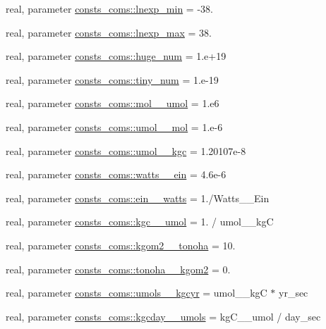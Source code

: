 \begin{DoxyCompactItemize}
\item 
real, parameter \hyperlink{namespaceconsts__coms_a7593d016f6b5a649ea21585de53834f0}{consts\+\_\+coms\+::lnexp\+\_\+min} = -\/38.
\item 
real, parameter \hyperlink{namespaceconsts__coms_aeb257212c54fabf595d8fb81170ef1d8}{consts\+\_\+coms\+::lnexp\+\_\+max} = 38.
\item 
real, parameter \hyperlink{namespaceconsts__coms_a6a5c10fb375429bb6cbc12bb37617f31}{consts\+\_\+coms\+::huge\+\_\+num} = 1.e+19
\item 
real, parameter \hyperlink{namespaceconsts__coms_a9dc9f1b4f076c19c09ba1adb961cddc3}{consts\+\_\+coms\+::tiny\+\_\+num} = 1.e-\/19
\item 
real, parameter \hyperlink{namespaceconsts__coms_a68d9924e4ce2e95d25b3c4862bf895d8}{consts\+\_\+coms\+::mol\+\_\+\_\+umol} = 1.e6
\item 
real, parameter \hyperlink{namespaceconsts__coms_aba28d1403d413d9d638ca1bf165cdd7a}{consts\+\_\+coms\+::umol\+\_\+\_\+mol} = 1.e-\/6
\item 
real, parameter \hyperlink{namespaceconsts__coms_a756eff7bd58f33114bdbf059ce2c6726}{consts\+\_\+coms\+::umol\+\_\+\_\+kgc} = 1.\+20107e-\/8
\item 
real, parameter \hyperlink{namespaceconsts__coms_aa14064c869d9c4d8d2b81b03e660b7d0}{consts\+\_\+coms\+::watts\+\_\+\_\+ein} = 4.\+6e-\/6
\item 
real, parameter \hyperlink{namespaceconsts__coms_a6eb4fb188bbbc09a5b24e1ffa57e03aa}{consts\+\_\+coms\+::ein\+\_\+\_\+watts} = 1./Watts\+\_\+\_\+\+Ein
\item 
real, parameter \hyperlink{namespaceconsts__coms_ac17190e203b566b6be141ddcd8344ae9}{consts\+\_\+coms\+::kgc\+\_\+\_\+umol} = 1. / umol\+\_\+\_\+kgC
\item 
real, parameter \hyperlink{namespaceconsts__coms_a2061fb811f5d7c9f856e62b48d85c10c}{consts\+\_\+coms\+::kgom2\+\_\+\_\+tonoha} = 10.
\item 
real, parameter \hyperlink{namespaceconsts__coms_aa7675ead7f9ba61cbdd5778d0cf09f95}{consts\+\_\+coms\+::tonoha\+\_\+\_\+kgom2} = 0.
\item 
real, parameter \hyperlink{namespaceconsts__coms_a80027bcbb9d21498f86d1dc0d0c856e9}{consts\+\_\+coms\+::umols\+\_\+\_\+kgcyr} = umol\+\_\+\_\+kgC $\ast$ yr\+\_\+sec
\item 
real, parameter \hyperlink{namespaceconsts__coms_ac60998ed6a6470c03f18f773175c77f4}{consts\+\_\+coms\+::kgcday\+\_\+\_\+umols} = kg\+C\+\_\+\_\+umol / day\+\_\+sec

\end{DoxyCompactItemize}
